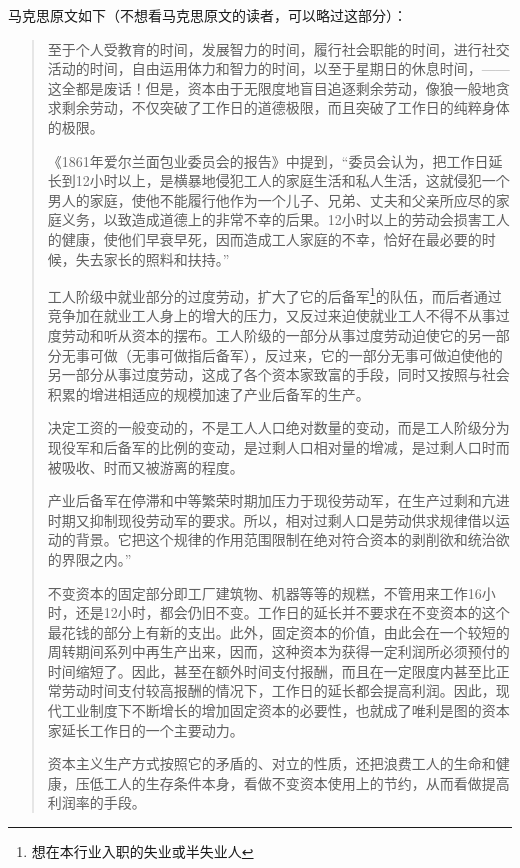 马克思原文如下（不想看马克思原文的读者，可以略过这部分）：
\begin{quotation}

  至于个人受教育的时间，发展智力的时间，履行社会职能的时间，进行社交活动的时间，自由运用体力和智力的时间，以至于星期日的休息时间，——这全都是废话！但是，资本由于无限度地盲目追逐剩余劳动，像狼一般地贪求剩余劳动，不仅突破了工作日的道德极限，而且突破了工作日的纯粹身体的极限。

  《1861年爱尔兰面包业委员会的报告》中提到，“委员会认为，把工作日延长到12小时以上，是横暴地侵犯工人的家庭生活和私人生活，这就侵犯一个男人的家庭，使他不能履行他作为一个儿子、兄弟、丈夫和父亲所应尽的家庭义务，以致造成道德上的非常不幸的后果。12小时以上的劳动会损害工人的健康，使他们早衰早死，因而造成工人家庭的不幸，恰好在最必要的时候，失去家长的照料和扶持。”

  工人阶级中就业部分的过度劳动，扩大了它的后备军\footnote{想在本行业入职的失业或半失业人}的队伍，而后者通过竞争加在就业工人身上的增大的压力，又反过来迫使就业工人不得不从事过度劳动和听从资本的摆布。工人阶级的一部分从事过度劳动迫使它的另一部分无事可做（无事可做指后备军），反过来，它的一部分无事可做迫使他的另一部分从事过度劳动，这成了各个资本家致富的手段，同时又按照与社会积累的增进相适应的规模加速了产业后备军的生产。

  决定工资的一般变动的，不是工人人口绝对数量的变动，而是工人阶级分为现役军和后备军的比例的变动，是过剩人口相对量的增减，是过剩人口时而被吸收、时而又被游离的程度。

  产业后备军在停滞和中等繁荣时期加压力于现役劳动军，在生产过剩和亢进时期又抑制现役劳动军的要求。所以，相对过剩人口是劳动供求规律借以运动的背景。它把这个规律的作用范围限制在绝对符合资本的剥削欲和统治欲的界限之内。”

  不变资本的固定部分即工厂建筑物、机器等等的规糕，不管用来工作16小时，还是12小时，都会仍旧不变。工作日的延长并不要求在不变资本的这个最花钱的部分上有新的支出。此外，固定资本的价值，由此会在一个较短的周转期间系列中再生产出来，因而，这种资本为获得一定利润所必须预付的时间缩短了。因此，甚至在额外时间支付报酬，而且在一定限度内甚至比正常劳动时间支付较高报酬的情况下，工作日的延长都会提高利润。因此，现代工业制度下不断增长的增加固定资本的必要性，也就成了唯利是图的资本家延长工作日的一个主要动力。

  资本主义生产方式按照它的矛盾的、对立的性质，还把浪费工人的生命和健康，压低工人的生存条件本身，看做不变资本使用上的节约，从而看做提高利润率的手段。
\end{quotation}


